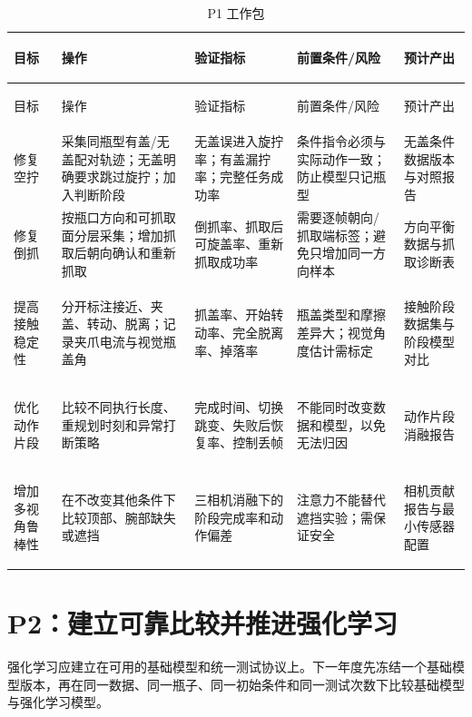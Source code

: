 \begingroup\small\setlength{\tabcolsep}{2pt}
\begin{longtable}{>{\bfseries\raggedright\arraybackslash}p{16mm}>{\raggedright\arraybackslash}p{25mm}>{\raggedright\arraybackslash}p{36mm}>{\raggedright\arraybackslash}p{31mm}>{\raggedright\arraybackslash}p{28mm}}
\caption{P1 工作包}\\
\toprule
目标 & 操作 & 验证指标 & 前置条件/风险 & 预计产出\\
\midrule\endfirsthead
\toprule
目标 & 操作 & 验证指标 & 前置条件/风险 & 预计产出\\
\midrule\endhead
修复空拧 &
采集同瓶型有盖/无盖配对轨迹；无盖明确要求跳过旋拧；加入判断阶段 &
无盖误进入旋拧率；有盖漏拧率；完整任务成功率 &
条件指令必须与实际动作一致；防止模型只记瓶型 &
无盖条件数据版本与对照报告\\
\addlinespace
修复倒抓 &
按瓶口方向和可抓取面分层采集；增加抓取后朝向确认和重新抓取 &
倒抓率、抓取后可旋盖率、重新抓取成功率 &
需要逐帧朝向/抓取端标签；避免只增加同一方向样本 &
方向平衡数据与抓取诊断表\\
\addlinespace
提高接触稳定性 &
分开标注接近、夹盖、转动、脱离；记录夹爪电流与视觉瓶盖角 &
抓盖率、开始转动率、完全脱离率、掉落率 &
瓶盖类型和摩擦差异大；视觉角度估计需标定 &
接触阶段数据集与阶段模型对比\\
\addlinespace
优化动作片段 &
比较不同执行长度、重规划时刻和异常打断策略 &
完成时间、切换跳变、失败后恢复率、控制丢帧 &
不能同时改变数据和模型，以免无法归因 &
动作片段消融报告\\
\addlinespace
增加多视角鲁棒性 &
在不改变其他条件下比较顶部、腕部缺失或遮挡 &
三相机消融下的阶段完成率和动作偏差 &
注意力不能替代遮挡实验；需保证安全 &
相机贡献报告与最小传感器配置\\
\bottomrule
\end{longtable}
\endgroup

\section{P2：建立可靠比较并推进强化学习}

强化学习应建立在可用的基础模型和统一测试协议上。下一年度先冻结一个基础模型版本，再在同一数据、同一瓶子、同一初始条件和同一测试次数下比较基础模型与强化学习模型。

